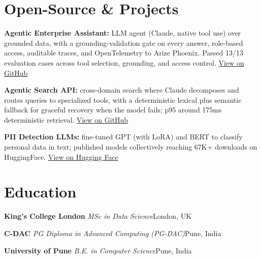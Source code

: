 \documentclass[10pt,a4paper]{article}
\newcommand{\sep}{\,\textcolor{accent!60}{\textbar}\,}
\begin{document}
\section{Open-Source \& Projects}
\begin{tight}
  \item \textbf{Agentic Enterprise Assistant:} LLM agent (Claude, native tool use) over grounded data, with a grounding-validation gate on every answer, role-based access, auditable traces, and OpenTelemetry to Arize Phoenix. Passed 13/13 evaluation cases across tool selection, grounding, and access control. \href{https://github.com/abhijeetscode/Agentic-Enterprise-Assistant}{View on GitHub}
  \item \textbf{Agentic Search API:} cross-domain search where Claude decomposes and routes queries to specialized tools, with a deterministic lexical plus semantic fallback for graceful recovery when the model fails; p95 around 175ms deterministic retrieval. \href{https://github.com/abhijeetscode/search-agent}{View on GitHub}
  \item \textbf{PII Detection LLMs:} fine-tuned GPT (with LoRA) and BERT to classify personal data in text; published models collectively reaching 67K+ downloads on HuggingFace. \href{https://huggingface.co/ab-ai/pii_model}{View on Hugging Face}
\end{tight}

\section{Education}
{\color{company}\bfseries King's College London}\sep{\itshape MSc in Data Science}\hfill {\color{muted}London, UK}\par\vspace{1pt}
{\color{company}\bfseries C-DAC}\sep{\itshape PG Diploma in Advanced Computing (PG-DAC)}\hfill {\color{muted}Pune, India}\par\vspace{1pt}
{\color{company}\bfseries University of Pune}\sep{\itshape B.E. in Computer Science}\hfill {\color{muted}Pune, India}\par
\end{document}
